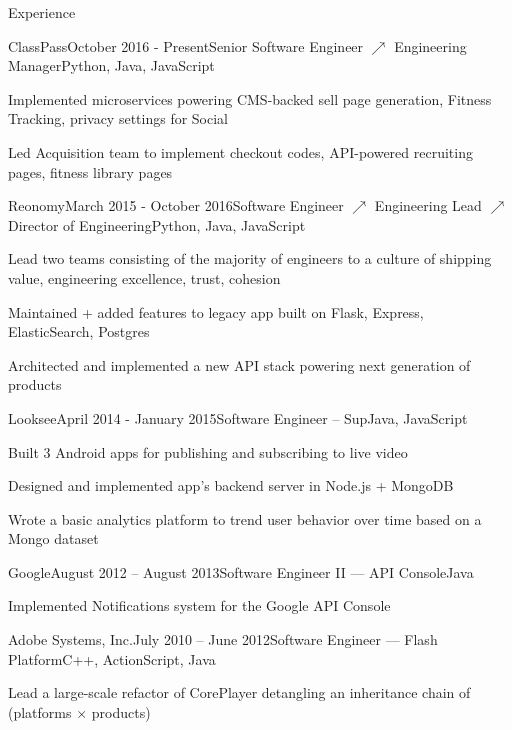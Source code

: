 \documentclass{resume} %
\begin{document}
\begin{rSection}{Experience}
\begin{rSubsection}{ClassPass}{October 2016 - Present}{Senior Software Engineer $\nearrow$ Engineering Manager}{Python, Java, JavaScript}
\item Implemented microservices powering CMS-backed sell page generation, Fitness Tracking, privacy settings for Social
\item Led Acquisition team to implement checkout codes, API-powered recruiting pages, fitness library pages
\end{rSubsection}
\begin{rSubsection}{Reonomy}{March 2015 - October 2016}{Software Engineer $\nearrow$ Engineering Lead $\nearrow$ Director of Engineering}{Python, Java, JavaScript}
\item Lead two teams consisting of the majority of engineers to a culture of shipping value, engineering excellence, trust, cohesion
\item Maintained + added features to legacy app built on Flask, Express, ElasticSearch, Postgres
\item Architected and implemented a new API stack powering next generation of products
\end{rSubsection}
\begin{rSubsection}{Looksee}{April 2014 - January 2015}{Software Engineer -- Sup}{Java, JavaScript}
\item Built 3 Android apps for publishing and subscribing to live video
\item Designed and implemented app's backend server in Node.js + MongoDB
\item Wrote a basic analytics platform to trend user behavior over time based on a Mongo dataset
\end{rSubsection}
\begin{rSubsection}{Google}{August 2012 -- August 2013}{Software Engineer II --- API Console}{Java}
\item Implemented Notifications system for the Google API Console
\end{rSubsection}
\begin{rSubsection}{Adobe Systems, Inc.}{July 2010 -- June 2012}{Software Engineer --- Flash Platform}{C++, ActionScript, Java}
\item Lead a large-scale refactor of CorePlayer detangling an inheritance chain of (platforms $\times$ products)
\end{rSubsection}
\end{rSection}
\end{document}
